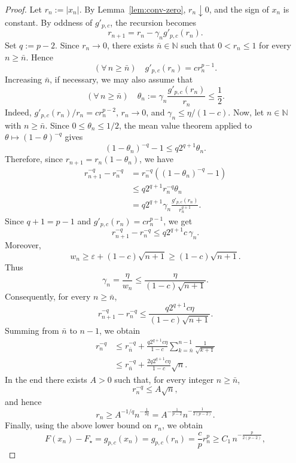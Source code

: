 \documentclass[10pt,a4paper]{amsart}
\newcommand{\N}{\mathbb{N}}
\begin{document}
\begin{proof}
Let \(r_n:=|x_n|\). By Lemma~\ref{lem:conv-zero}, \(r_n\downarrow0\), and the sign of \(x_n\) is constant. By oddness of \(g'_{p,c}\), the recursion becomes
\[
    r_{n+1}
    =
    r_n-\gamma_ng'_{p,c}(r_n).
\]
Set \(q:=p-2\). Since \(r_n\to0\), there exists \(\bar{n}\in\N\) such that \(0<r_n\le1\) for every \(n\ge \bar{n}\). Hence
\[
(\forall\,n\geq \bar{n})\quad    g'_{p,c}(r_n)=cr_n^{p-1}.
\]
Increasing \(\bar{n}\), if necessary, we may also assume that
\[
(\forall\,n\geq \bar{n})\quad
    \theta_n
    :=
    \gamma_n\frac{g'_{p,c}(r_n)}{r_n}
    \le \frac12.
\]
Indeed, \(g'_{p,c}(r_n)/r_n=cr_n^{p-2}\), \(r_n\to0\), and \(\gamma_n\le\eta/(1-c)\).
Now, let $n\in \N$ with $n\geq \bar{n}$.
Since \(0\le\theta_n\le1/2\), the mean value theorem applied to \(\theta\mapsto(1-\theta)^{-q}\) gives
\[
    (1-\theta_n)^{-q}-1
    \le
    q2^{q+1}\theta_n.
\]
Therefore, since \(r_{n+1}=r_n(1-\theta_n)\), we have
\[
\begin{aligned}
    r_{n+1}^{-q}-r_n^{-q}
    &=
    r_n^{-q}\left((1-\theta_n)^{-q}-1\right) \\
    &\le
    q2^{q+1}r_n^{-q}\theta_n \\
    &=
    q2^{q+1}\gamma_n
    \frac{g'_{p,c}(r_n)}{r_n^{q+1}}.
\end{aligned}
\]
Since \(q+1=p-1\) and \(g'_{p,c}(r_n)=cr_n^{p-1}\), we get
\[
    r_{n+1}^{-q}-r_n^{-q}
    \le
    q2^{q+1}c\,\gamma_n.
\]
Moreover,
\[
    w_n
    \ge
    \varepsilon+(1-c)\sqrt{n+1}
    \ge
    (1-c)\sqrt{n+1}.
\]
Thus
\[
    \gamma_n
    =
    \frac{\eta}{w_n}
    \le
    \frac{\eta}{(1-c)\sqrt{n+1}}.
\]
Consequently, for every \(n\ge \bar{n}\),
\[
    r_{n+1}^{-q}-r_n^{-q}
    \le
    \frac{q2^{q+1}c\eta}{(1-c)\sqrt{n+1}}.
\]
Summing from \(\bar{n}\) to \(n-1\), we obtain
\[
\begin{aligned}
    r_n^{-q}
    &\le
    r_{\bar{n}}^{-q}
    +
    \frac{q2^{q+1}c\eta}{1-c}
    \sum_{k=\bar{n}}^{n-1}\frac1{\sqrt{k+1}}  \\
    &\le
    r_{\bar{n}}^{-q}
    +
    \frac{2q2^{q+1}c\eta}{1-c}\sqrt n.
\end{aligned}
\]
In the end there exists \(A>0\) such that, for every integer $n\geq \bar{n}$,
\[
    r_n^{-q}\le A\sqrt n,
\]
and hence
\[
    r_n
    \ge
    A^{-1/q}n^{-\frac1{2q}}
    =
    A^{-\frac1{p-2}}n^{-\frac1{2(p-2)}}.
\]
Finally, using the above lower bound on \(r_n\), we obtain
\[
    F(x_n)-F_\star
    =
    g_{p,c}(x_n)
    =
    g_{p,c}(r_n) = \frac{c}{p}r_n^p
    \ge
    C_1\,
    n^{-\frac{p}{2(p-2)}},
\]
\end{proof}
\end{document}
